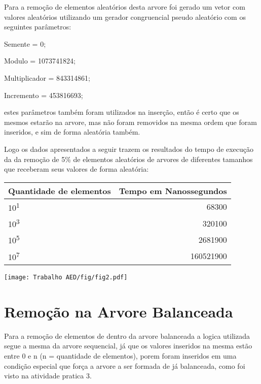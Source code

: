 Para a remoção de elementos aleatórios desta arvore foi gerado um vetor com valores aleatórios utilizando um gerador congruencial pseudo aleatório com os seguintes parâmetros:
        \begin{center}
        Semente = 0;
       
        Modulo = 1073741824;
       
        Multiplicador = 843314861;
       
        Incremento = 453816693;
        \end{center}

estes parâmetros também foram utilizados na inserção, então é certo que os mesmos estarão na arvore, mas não foram removidos na mesma ordem que foram inseridos, e sim de forma aleatória também.

Logo os dados apresentados a seguir trazem os resultados do tempo de execução da da remoção de 5\% de elementos aleatórios de arvores de diferentes tamanhos que receberam seus valores de forma aleatória:

\begin{center}
        \begin{tabular}{| l | r |}
            \hline
            Quantidade de elementos & Tempo em Nanossegundos\\
            \hline
            10\textsuperscript{1} & 68300\\
            10\textsuperscript{3} & 320100\\
            10\textsuperscript{5} & 2681900\\
            10\textsuperscript{7} & 160521900\\
            \hline
        \end{tabular}
    \end{center}
    
    \begin{center}
            \texttt{[image: Trabalho AED/fig/fig2.pdf]}
            \label{fig:Grafico 2}
    \end{center}
    
\section{Remoção na Arvore Balanceada}
Para a remoção de elementos de dentro da arvore balanceada a logica utilizada segue a mesma da arvore sequencial, já que os valores inseridos na mesma estão entre 0 e n (n = quantidade de elementos), porem foram inseridos em uma condição especial que força a arvore a ser formada de já balanceada, como foi visto na atividade pratica 3.

